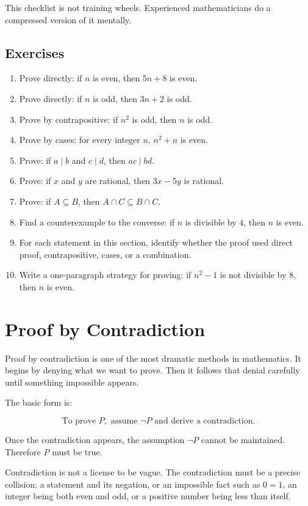 This checklist is not training wheels. Experienced mathematicians do a compressed version of it mentally.

\subsection{Exercises}

\begin{enumerate}
\item Prove directly: if $n$ is even, then $5n+8$ is even.
\item Prove directly: if $n$ is odd, then $3n+2$ is odd.
\item Prove by contrapositive: if $n^2$ is odd, then $n$ is odd.
\item Prove by cases: for every integer $n$, $n^2+n$ is even.
\item Prove: if $a\mid b$ and $c\mid d$, then $ac\mid bd$.
\item Prove: if $x$ and $y$ are rational, then $3x-5y$ is rational.
\item Prove: if $A\subseteq B$, then $A\cap C\subseteq B\cap C$.
\item Find a counterexample to the converse: if $n$ is divisible by $4$, then $n$ is even.
\item For each statement in this section, identify whether the proof used direct proof, contrapositive, cases, or a combination.
\item Write a one-paragraph strategy for proving: if $n^2-1$ is not divisible by $8$, then $n$ is even.
\end{enumerate}

\newpage
\section{Proof by Contradiction}

Proof by contradiction is one of the most dramatic methods in mathematics. It begins by denying what we want to prove. Then it follows that denial carefully until something impossible appears.

The basic form is:

\[
\text{To prove }P,\text{ assume }\neg P\text{ and derive a contradiction.}
\]

Once the contradiction appears, the assumption $\neg P$ cannot be maintained. Therefore $P$ must be true.

\begin{focusbox}
Contradiction is not a license to be vague. The contradiction must be a precise collision: a statement and its negation, or an impossible fact such as $0=1$, an integer being both even and odd, or a positive number being less than itself.
\end{focusbox}

